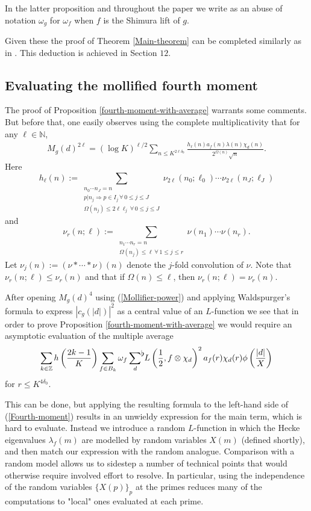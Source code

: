 \documentclass[a4paper,10pt,twoside]{amsart}
\theoremstyle{definition}
\numberwithin{equation}{section}
\newcommand\Z{\mathbb{Z}}
\renewcommand\:{\colon}
\newcommand{\sumflat}{\mathop{{\sum}^{\raisebox{-3pt}{\makebox[0pt][l]{$\flat$}}}}}
\begin{document}
\noindent In the latter proposition and throughout the paper we write as an abuse of notation $\omega_g$ for $\omega_f$ when $f$ is the Shimura lift of $g$. 

Given these the proof of Theorem \ref{Main-theorem} can be completed similarly as in \cite{Jaasaari2026}. This deduction is achieved in Section $12$. 

\subsection{Evaluating the mollified fourth moment}

\noindent The proof of Proposition \ref{fourth-moment-with-average} warrants some comments. But before that, one easily observes using the complete multiplicativity that for any $\ell\in\mathbb N$,
\begin{align}\label{Mollifier-power}
M_g(d)^{2\ell}=(\log K)^{\ell/2}\sum_{n\leq K^{2\ell\delta_0}}\frac{h_\ell(n)a_f(n)\lambda(n)\chi_d(n)}{2^{\Omega(n)}\sqrt n}.
\end{align}
Here
\[h_\ell(n):=\sum_{\substack{n_0\cdots n_J=n \\
p|n_j\Rightarrow p\in I_j\,\forall\, 0\leq j\leq J\\
\Omega(n_j)\leq 2\ell\ell_j\,\forall\, 0\leq j\leq J}}\nu_{2\ell}(n_0;\ell_0)\cdots\nu_{2\ell}(n_J;\ell_J) \]
and 
\[
\nu_r(n;\ell):=\sum_{\substack{n_1\cdots n_r=n \\
\Omega(n_j)\leq \ell\,\forall\, 1\leq j\leq r }}\nu(n_1)\cdots\nu(n_r).
\]
Let $\nu_j(n):=(\nu*\cdots*\nu)(n)$ denote the $j$-fold convolution of $\nu$. Note that $\nu_r(n;\ell)\leq\nu_r(n)$ and that if $\Omega(n)\leq\ell$, then $\nu_r(n;\ell)=\nu_r(n)$. 

After opening $M_g(d)^4$ using (\ref{Mollifier-power}) and applying Waldspurger's formula to express $|c_g(|d|)|^2$ as a central value of an $L$-function we see that in order to prove Proposition \ref{fourth-moment-with-average} we would require an asymptotic evaluation of the multiple average
\[ 
\sum_{k\in\Z}h\left(\frac{2k-1}K\right)\sum_{f\in B_k}\omega_f\sumflat_d\, L\left(\frac12,f\otimes\chi_d\right)^2 a_f(r)\chi_d(r)\phi\left(\frac{|d|}X\right)
\]
for $r\leq K^{4\delta_0}$.

This can be done, but applying the resulting formula to the left-hand side of (\ref{Fourth-moment}) results in an unwieldy expression for the main term, which is hard to evaluate. Instead we introduce a random $L$-function in which the Hecke eigenvalues $\lambda_f(m)$ are modelled by random variables $X(m)$ (defined shortly), and then match our expression with the random analogue. Comparison with a random model allows us to sidestep a number of technical points that would otherwise require involved effort to resolve. In particular, using the independence of the random variables $\{X(p)\}_p$ at the primes reduces many of the computations to "local" ones evaluated at each prime.
 
\end{document}
